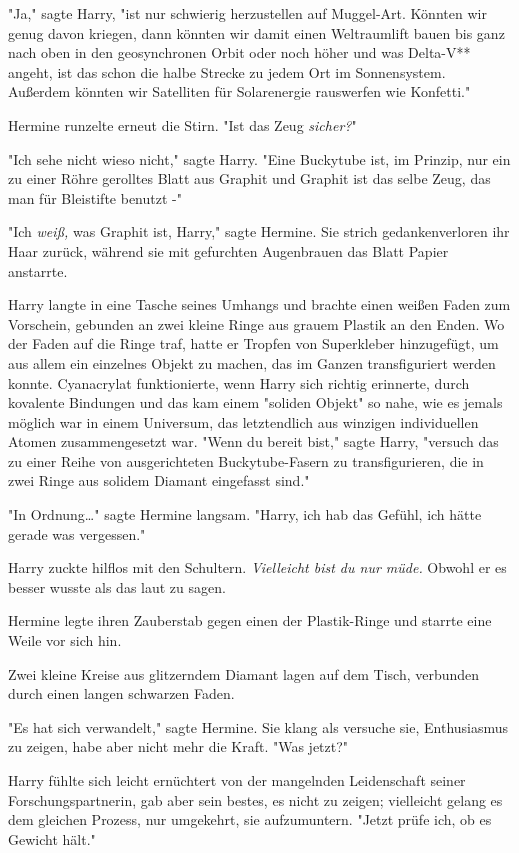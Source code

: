 {"Ja," sagte Harry, "ist nur schwierig herzustellen auf Muggel-Art. Könnten wir genug davon kriegen, dann könnten wir damit einen Weltraumlift bauen bis ganz nach oben in den geosynchronen Orbit oder noch höher und was Delta-V** angeht, ist das schon die halbe Strecke zu jedem Ort im Sonnensystem. Außerdem könnten wir Satelliten für Solarenergie rauswerfen wie Konfetti."

Hermine runzelte erneut die Stirn. "Ist das Zeug \emph{sicher?}"

"Ich sehe nicht wieso nicht," sagte Harry. "Eine Buckytube ist, im Prinzip, nur ein zu einer Röhre gerolltes Blatt aus Graphit und Graphit ist das selbe Zeug, das man für Bleistifte benutzt -"

"Ich \emph{weiß,} was Graphit ist, Harry," sagte Hermine. Sie strich gedankenverloren ihr Haar zurück, während sie mit gefurchten Augenbrauen das Blatt Papier anstarrte.

Harry langte in eine Tasche seines Umhangs und brachte einen weißen Faden zum Vorschein, gebunden an zwei kleine Ringe aus grauem Plastik an den Enden. Wo der Faden auf die Ringe traf, hatte er Tropfen von Superkleber hinzugefügt, um aus allem ein einzelnes Objekt zu machen, das im Ganzen transfiguriert werden konnte. Cyanacrylat funktionierte, wenn Harry sich richtig erinnerte, durch kovalente Bindungen und das kam einem "soliden Objekt" so nahe, wie es jemals möglich war in einem Universum, das letztendlich aus winzigen individuellen Atomen zusammengesetzt war. "Wenn du bereit bist," sagte Harry, "versuch das zu einer Reihe von ausgerichteten Buckytube-Fasern zu transfigurieren, die in zwei Ringe aus solidem Diamant eingefasst sind."

"In Ordnung…" sagte Hermine langsam. "Harry, ich hab das Gefühl, ich hätte gerade was vergessen."

Harry zuckte hilflos mit den Schultern. \emph{Vielleicht bist du nur müde.} Obwohl er es besser wusste als das laut zu sagen.

Hermine legte ihren Zauberstab gegen einen der Plastik-Ringe und starrte eine Weile vor sich hin.

Zwei kleine Kreise aus glitzerndem Diamant lagen auf dem Tisch, verbunden durch einen langen schwarzen Faden.

"Es hat sich verwandelt," sagte Hermine. Sie klang als versuche sie, Enthusiasmus zu zeigen, habe aber nicht mehr die Kraft. "Was jetzt?"

Harry fühlte sich leicht ernüchtert von der mangelnden Leidenschaft seiner Forschungspartnerin, gab aber sein bestes, es nicht zu zeigen; vielleicht gelang es dem gleichen Prozess, nur umgekehrt, sie aufzumuntern. "Jetzt prüfe ich, ob es Gewicht hält."

}
